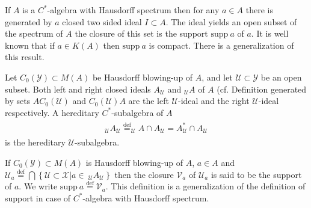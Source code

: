 \documentclass{beamer}
\theoremstyle{plain}
\newcommand{\supp}{\mathrm{supp}}
\newcommand{\sU}{\mathcal{U}}       %
\newcommand{\sV}{\mathcal{V}}       %
\newcommand{\sX}{\mathcal{X}}       %
\newcommand{\sY}{\mathcal{Y}}       %
\newcommand{\bean}{\begin{eqnarray*}}
\newcommand{\eean}{\end{eqnarray*}}
\newcommand{\bydef}{\stackrel{\mathrm{def}}{=}}
\begin{document}
\begin{frame}
	If $A$ is a $C^*$-algebra with Hausdorff spectrum then for any $a\in A$ there is generated by $a$ closed two sided ideal $I\subset A$. The ideal yields an open subset of the spectrum of $A$ the closure of this set is the \alert{support} $\supp~a$ of $a$. It is well known  that if $a \in K\left(A \right)$ then  $\supp~a$ is compact. There is a generalization of this result.
\end{frame}
\begin{frame}
\begin{definition}\label{blowing_ideals_au_ua_defn}
	Let  $ C_0\left(\sY\right)\subset  M\left( A\right) $ be  Hausdorff blowing-up of $A$, and let $\sU \subset \sY$ be an open subset. Both   left and right  closed ideals $A_\sU$  and $_\sU A$ of $A$ (cf. Definition  generated by sets 	$AC_0\left( \sU\right)$ and $C_0\left( \sU\right)A$ are the \alert{left} $\sU$-\alert{ideal} and the \alert{right} $\sU$-\alert{ideal} respectively. A hereditary $C^*$-subalgebra of $A$
	\bean
	\begin{split}
		_\sU A_\sU \bydef		_\sU A\cap  A_\sU = A^*	_\sU \cap  A_\sU
	\end{split}
	\eean	
	is the \alert{hereditary} $\sU$-\alert{subalgebra}.
	
	\end{definition}
	
	\begin{definition}\label{blowing_support_defn}
		If $C_0\left( \sY\right) \subset M\left(A \right)$ is    {Hausdorff blowing-up} of $A$,  $a \in A$ and
		$
		\sU_a \bydef\bigcap 
		\left\{\left.{\sU} \subset \sX\right| a\in~_\sU A_{\sU} \right\}
		$
		then the  closure $\sV_a$  of $\sU_a$ is said to be the \alert{support} of $a$. We write $\supp~ a \bydef \sV_a$. This definition is a generalization of the definition of support in case of $C^*$-algebra with Hausdorff spectrum. 
	\end{definition}
	
\end{frame}
\end{document}
